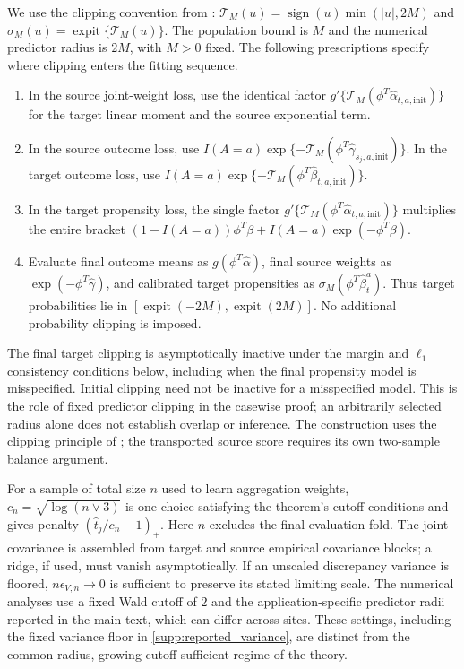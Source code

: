 \documentclass[12pt]{article}
\begin{document}
We use the clipping convention from : $\mathcal T_M(u)=\operatorname{sign}(u)\min(|u|,2M)$ and $\sigma_M(u)=\operatorname{expit}\{\mathcal T_M(u)\}$.
The population bound is $M$ and the numerical predictor radius is $2M$, with $M>0$ fixed. The following prescriptions specify where clipping enters the fitting sequence.
\begin{enumerate}[label=(\alph*),leftmargin=*]
\item In the source joint-weight loss, use the identical factor $g'\{\mathcal T_M(\phi^T\widehat\alpha_{t,a,\mathrm{init}})\}$ for the target linear moment and the source exponential term.
\item In the source outcome loss, use $I(A=a)\exp\{-\mathcal T_M(\phi^T\widehat\gamma_{s_j,a,\mathrm{init}})\}$. In the target outcome loss, use $I(A=a)\exp\{-\mathcal T_M(\phi^T\widehat\beta_{t,a,\mathrm{init}})\}$.
\item In the target propensity loss, the single factor $g'\{\mathcal T_M(\phi^T\widehat\alpha_{t,a,\mathrm{init}})\}$ multiplies the entire bracket $(1-I(A=a))\phi^T\beta+I(A=a)\exp(-\phi^T\beta)$.
\item Evaluate final outcome means as $g(\phi^T\widehat\alpha)$, final source weights as $\exp(-\phi^T\widehat\gamma)$, and calibrated target propensities as $\sigma_M(\phi^T\widehat\beta_t^a)$. Thus target probabilities lie in $[\operatorname{expit}(-2M),\operatorname{expit}(2M)]$. No additional probability clipping is imposed.
\end{enumerate}
The final target clipping is asymptotically inactive under the margin and $\ell_1$ consistency conditions below, including when the final propensity model is misspecified. Initial clipping need not be inactive for a misspecified model. This is the role of fixed predictor clipping in the casewise proof; an arbitrarily selected radius alone does not establish overlap or inference. The construction uses the clipping principle of \citet[eqs.~(11)--(13), Assumption~4]{hou2025efficient}; the transported source score requires its own two-sample balance argument.

For a sample of total size $n$ used to learn aggregation weights, $c_n=\sqrt{\log(n\vee3)}$ is one choice satisfying the theorem's cutoff conditions and gives penalty $(\widehat t_j/c_n-1)_+$. Here $n$ excludes the final evaluation fold. The joint covariance is assembled from target and source empirical covariance blocks; a ridge, if used, must vanish asymptotically. If an unscaled discrepancy variance is floored, $n\epsilon_{V,n}\to0$ is sufficient to preserve its stated limiting scale. The numerical analyses use a fixed Wald cutoff of $2$ and the application-specific predictor radii reported in the main text, which can differ across sites. These settings, including the fixed variance floor in \cref{supp:reported_variance}, are distinct from the common-radius, growing-cutoff sufficient regime of the theory.
\end{document}
